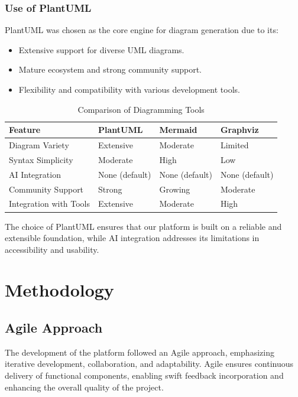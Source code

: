 \subsubsection{Use of PlantUML}
PlantUML was chosen as the core engine for diagram generation due to its:

\begin{itemize}
    \item Extensive support for diverse UML diagrams.
    \item Mature ecosystem and strong community support.
    \item Flexibility and compatibility with various development tools.
\end{itemize}

\begin{table}[h!]
    \centering
    \caption{Comparison of Diagramming Tools}
    \begin{tabular}{|l|l|l|l|}
        \hline
        \textbf{Feature} & \textbf{PlantUML} & \textbf{Mermaid} & \textbf{Graphviz} \\
        \hline
        Diagram Variety & Extensive & Moderate & Limited \\
        Syntax Simplicity & Moderate & High & Low \\
        AI Integration & None (default) & None (default) & None (default) \\
        Community Support & Strong & Growing & Moderate \\
        Integration with Tools & Extensive & Moderate & High \\
        \hline
    \end{tabular}
\end{table}

The choice of PlantUML ensures that our platform is built on a reliable and extensible foundation, while AI integration addresses its limitations in accessibility and usability.




\section{Methodology}
\subsection{Agile Approach}
The development of the platform followed an Agile approach, emphasizing iterative development, collaboration, and adaptability. Agile ensures continuous delivery of functional components, enabling swift feedback incorporation and enhancing the overall quality of the project.

